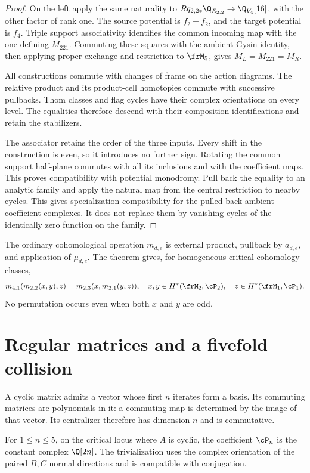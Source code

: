 \begin{proof}
On the left apply the same naturality to
$Rq_{2,2*}\Q_{E_{2,2}}\to\Q_{V_4}[16]$, with the other factor
of rank one. The source potential is $f_2+f_2$, and the target
potential is $f_4$. Triple support associativity identifies the
common incoming map with the one defining $M_{221}$.
Commuting these squares with the ambient Gysin identity, then
applying proper exchange and restriction to $\frM_5$, gives
$M_L=M_{221}=M_R$.

All constructions commute with changes of frame on the action
diagrams. The relative product and its product-cell homotopies
commute with successive pullbacks. Thom classes and flag cycles
have their complex orientations on every level. The equalities
therefore descend with their composition identifications and
retain the stabilizers.

The associator retains the order of the three inputs. Every shift
in the construction is even, so it introduces no further sign.
Rotating the common support half-plane commutes with all its
inclusions and with the coefficient maps. This proves compatibility
with potential monodromy. Pull back the equality to an analytic
family and apply the natural map from the central restriction to
nearby cycles. This gives specialization compatibility for the
pulled-back ambient coefficient complexes. It does not replace them
by vanishing cycles of the identically zero function on the family.
\end{proof}

The ordinary cohomological operation $m_{d,e}$ is external product,
pullback by $a_{d,e}$, and application of $\mu_{d,e}$.
The theorem gives, for homogeneous critical cohomology classes,
\[
 m_{4,1}(m_{2,2}(x,y),z)=m_{2,3}(x,m_{2,1}(y,z)),
 \quad x,y\in H^*(\frM_2,\cP_2),\quad
 z\in H^*(\frM_1,\cP_1).
\]
No permutation occurs even when both $x$ and $y$ are odd.

\section{Regular matrices and a fivefold collision}
\label{fl221:sec:cyclic}

A cyclic matrix admits a vector whose first $n$ iterates form a
basis. Its commuting matrices are polynomials in it: a commuting
map is determined by the image of that vector. Its centralizer
therefore has dimension $n$ and is commutative.

\begin{lemma}
\label{fl221:lem:cyclic}
For $1\le n\le5$, on the critical locus where $A$ is cyclic,
the coefficient $\cP_n$ is the constant complex $\Q[2n]$.
The trivialization uses the complex orientation of the paired
$B,C$ normal directions and is compatible with conjugation.
\end{lemma}

